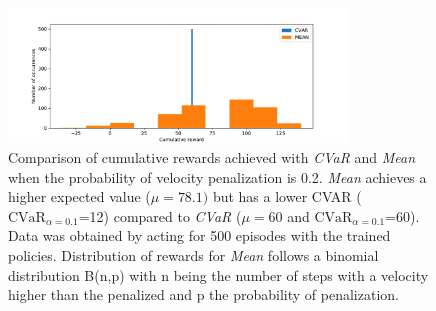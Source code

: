 \begin{figure}[ht]
        \centering
        \includegraphics[width=0.8\textwidth]{images/Car/histogram_rewards1vs01.pdf}
        \caption{Comparison of cumulative rewards achieved with \textit{CVaR} and \textit{Mean}
        when the probability of velocity penalization is 0.2.
        \textit{Mean} achieves a higher expected value  ($\mu=78.1)$  but 
        has a lower CVAR ($\text{CVaR}_{\alpha= 0.1}$=12) compared to
        \textit{CVaR} ($\mu=60$ and $\text{CVaR}_{\alpha= 0.1}$=60).
        Data was obtained by acting for 500 episodes with the trained policies.
        Distribution of rewards for \textit{Mean} follows a binomial distribution B(n,p)
        with n being the number of steps with a velocity higher than the penalized and 
        p the probability of penalization.}
        \label{histogram_cvar_vs_mean}
    
\end{figure}


